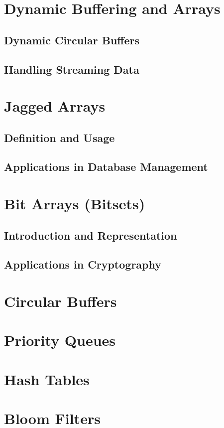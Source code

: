 \documentclass{book}
\begin{document}
	\section{Dynamic Buffering and Arrays}
	\subsection{Dynamic Circular Buffers}
	\subsection{Handling Streaming Data}
	
	\section{Jagged Arrays}
	\subsection{Definition and Usage}
	\subsection{Applications in Database Management}
	
	\section{Bit Arrays (Bitsets)}
	\subsection{Introduction and Representation}
	\subsection{Applications in Cryptography}
	\section{Circular Buffers}
	\section{Priority Queues}
	\section{Hash Tables}
	\section{Bloom Filters}
\end{document}
